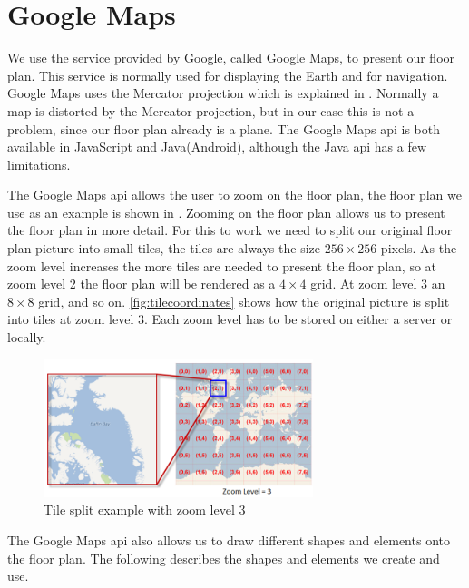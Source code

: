 \section{Google Maps}
We use the service provided by Google, called Google Maps, to present our floor plan. This service is normally used for displaying the Earth and for navigation. Google Maps uses the Mercator projection which is explained in . Normally a map is distorted by the Mercator projection, but in our case this is not a problem, since our floor plan already is a plane. The Google Maps \ac{api} is both available in JavaScript and Java(Android), although the Java \ac{api} has a few limitations.

The Google Maps \ac{api} allows the user to zoom on the floor plan, the floor plan we use as an example is shown in . Zooming on the floor plan allows us to present the floor plan in more detail. For this to work we need to split our original floor plan picture into small tiles, the tiles are always the size $256 \times 256$ pixels. As the zoom level increases the more tiles are needed to present the floor plan, so at zoom level 2 the floor plan will be rendered as a $4 \times 4$ grid. At zoom level 3 an $8 \times 8$ grid, and so on. \autoref{fig:tilecoordinates} shows how the original picture is split into tiles at zoom level 3. Each zoom level has to be stored on either a server or locally.

\begin{figure}[H]
\centering
\includegraphics[width=0.7\textwidth]{img/tilecoordinates2.png}
\caption{Tile split example with zoom level 3 \citep{tilecoordinates}}
\label{fig:tilecoordinates}
\end{figure}

The Google Maps \ac{api} also allows us to draw different shapes and elements onto the floor plan. The following describes the shapes and elements we create and use.%

